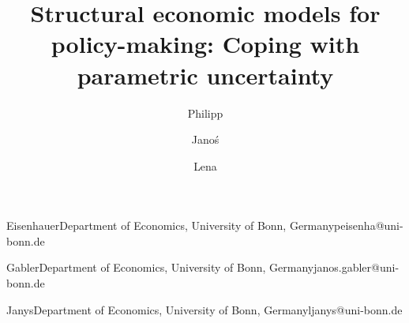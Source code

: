 %
%
\title{Structural economic models for policy-making: Coping with parametric uncertainty}

\author{Philipp}{Eisenhauer}{Department of Economics, University of Bonn, Germany}{peisenha@uni-bonn.de}
\author{Jano\'s }{Gabler}{Department of Economics, University of Bonn, Germany}{janos.gabler@uni-bonn.de}
\author{Lena}{Janys}{Department of Economics, University of Bonn, Germany}{ljanys@uni-bonn.de}

